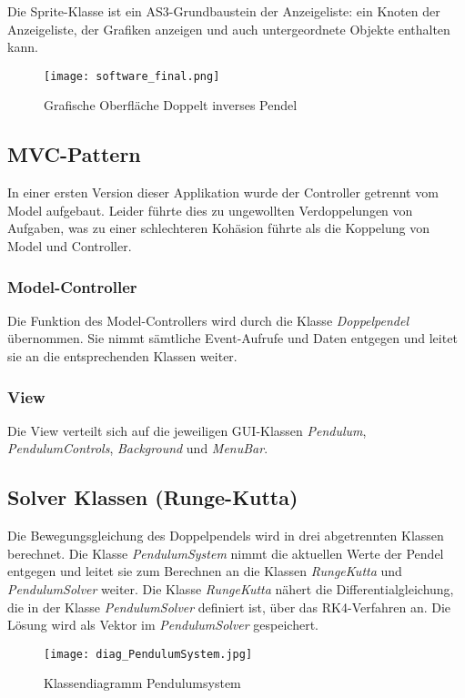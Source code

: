 \documentclass[12pt]{article}
\numberwithin{equation}{subsection}
\begin{document}
Die Sprite-Klasse ist ein AS3-Grundbaustein der Anzeigeliste: ein Knoten der Anzeigeliste, der Grafiken anzeigen und auch untergeordnete Objekte enthalten kann.

\begin{figure}[H]
	\centering
	\texttt{[image: software\_final.png]}
	\caption{Grafische Oberfläche Doppelt inverses Pendel}
	\label{fig:xml}
\end{figure}

\subsection{MVC-Pattern}
In einer ersten Version dieser Applikation wurde der Controller getrennt vom Model aufgebaut. Leider führte dies zu ungewollten Verdoppelungen von Aufgaben, was zu einer schlechteren Kohäsion führte als die Koppelung von Model und Controller.

\subsubsection{Model-Controller}
Die Funktion des Model-Controllers wird durch die Klasse \textit{Doppelpendel} übernommen. Sie nimmt sämtliche Event-Aufrufe und Daten entgegen und leitet sie an die entsprechenden Klassen weiter.

\subsubsection{View}
Die View verteilt sich auf die jeweiligen GUI-Klassen \textit{Pendulum}, \textit{PendulumControls}, \textit{Background} und \textit{MenuBar}.

\subsection{Solver Klassen (Runge-Kutta)}
Die Bewegungsgleichung des Doppelpendels wird in drei abgetrennten Klassen berechnet. Die Klasse \textit{PendulumSystem} nimmt die aktuellen Werte der Pendel entgegen und leitet sie zum Berechnen an die Klassen \textit{RungeKutta} und \textit{PendulumSolver} weiter. Die Klasse \textit{RungeKutta} nähert die Differentialgleichung, die in der Klasse \textit{PendulumSolver} definiert ist, über das RK4-Verfahren an. Die Lösung wird als Vektor im \textit{PendulumSolver} gespeichert.

\begin{figure}[H]
	\centering
	\texttt{[image: diag\_PendulumSystem.jpg]}
	\caption{Klassendiagramm Pendulumsystem}
	\label{fig:xml}
\end{figure}
\end{document}
